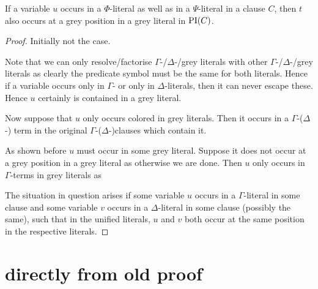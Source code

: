 \documentclass[,%
	draft=false,%
	numbers=noendperiod
	12pt,
	a4paper,
	oneside,%
	openany,
]{memoir}
\begin{document}
\begin{clemma}
	If a variable $u$ occurs in a $\Phi$-literal as well as in a $\Psi$-literal in a clause $C$, then $t$ also occurs at a grey position in a grey literal in $\operatorname{PI}(C)$.
\end{clemma}
\begin{proof}
	Initially not the case.

	Note that we can only resolve/factorise $\Gamma$-/$\Delta$-/grey literals with other $\Gamma$-/$\Delta$-/grey literals as clearly the predicate symbol must be the same for both literals.
	Hence if a variable occurs only in $\Gamma$- or only in $\Delta$-literals, then it can never escape these.
	Hence $u$ certainly is contained in a grey literal.

	Now suppose that $u$ only occurs colored in grey literals.
	Then it occurs in a $\Gamma$-($\Delta$-) term in the original $\Gamma$-($\Delta$-)clauses which contain it.

	As shown before $u$ must occur in some grey literal.
	Suppose it does not occur at a grey position in a grey literal as otherwise we are done.
	Then $u$ only occurs in $\Gamma$-terms in grey literals as 




	The situation in question arises if some variable $u$ occurs in a $\Gamma$-literal in some clause and some variable $v$ occurs in a $\Delta$-literal in some clause (possibly the same), such that in the unified literals, $u$ and $v$ both occur at the same position in the respective literals.


\end{proof}

\newpage

\section{directly from old proof}
\end{document}

